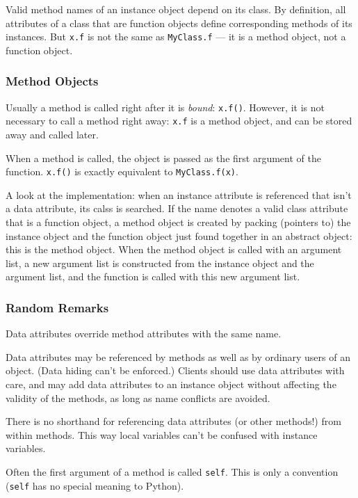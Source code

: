 Valid method names of an instance object depend on its class.
By definition, all attributes of a class that are function objects
define corresponding methods of its instances.
But \verb=x.f= is not the same as \verb=MyClass.f= ---
it is a method object, not a function object.


\subsubsection{Method Objects}

Usually a method is called right after it is \emph{bound}: \verb=x.f()=.
However, it is not necessary to call a method right away:
\verb=x.f= is a method object, and can be stored away and called later.

When a method is called,
the object is passed as the first argument of the function.
\verb=x.f()= is exactly equivalent to \verb=MyClass.f(x)=.

A look at the implementation:
when an instance attribute is referenced that isn't a data attribute,
its calss is searched.
If the name denotes a valid class attribute that is a function object,
a method object is created by packing (pointers to)
the instance object and the function object just found together
in an abstract object: this is the method object.
When the method object is called with an argument list,
a new argument list is constructed
from the instance object and the argument list,
and the function is called with this new argument list.


\subsubsection{Random Remarks}

Data attributes override method attributes with the same name.

Data attributes may be referenced by methods
as well as by ordinary users of an object.
(Data hiding can't be enforced.)
Clients should use data attributes with care,
and may add data attributes to an instance object
without affecting the validity of the methods,
as long as name conflicts are avoided.

There is no shorthand for referencing data attributes (or other methods!)
from within methods.
This way local variables can't be confused with instance variables.

Often the first argument of a method is called \verb=self=.
This is only a convention (\verb=self= has no special meaning to Python).

